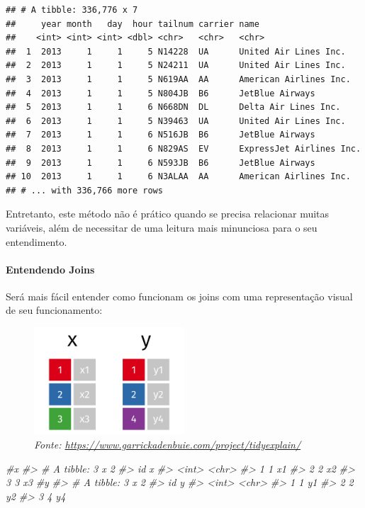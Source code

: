 \documentclass[
]{article}
\newenvironment{Shaded}{\begin{snugshade}}{\end{snugshade}}
\newcommand{\CommentTok}[1]{\textcolor[rgb]{0.56,0.35,0.01}{\textit{#1}}}
\begin{document}
\begin{verbatim}
## # A tibble: 336,776 x 7
##     year month   day  hour tailnum carrier name                    
##    <int> <int> <int> <dbl> <chr>   <chr>   <chr>                   
##  1  2013     1     1     5 N14228  UA      United Air Lines Inc.   
##  2  2013     1     1     5 N24211  UA      United Air Lines Inc.   
##  3  2013     1     1     5 N619AA  AA      American Airlines Inc.  
##  4  2013     1     1     5 N804JB  B6      JetBlue Airways         
##  5  2013     1     1     6 N668DN  DL      Delta Air Lines Inc.    
##  6  2013     1     1     5 N39463  UA      United Air Lines Inc.   
##  7  2013     1     1     6 N516JB  B6      JetBlue Airways         
##  8  2013     1     1     6 N829AS  EV      ExpressJet Airlines Inc.
##  9  2013     1     1     6 N593JB  B6      JetBlue Airways         
## 10  2013     1     1     6 N3ALAA  AA      American Airlines Inc.  
## # ... with 336,766 more rows
\end{verbatim}

Entretanto, este método não é prático quando se precisa relacionar
muitas variáveis, além de necessitar de uma leitura mais minunciosa para
o seu entendimento.

\hypertarget{entendendo-joins}{%
\paragraph{Entendendo Joins}\label{entendendo-joins}}

Será mais fácil entender como funcionam os joins com uma representação
visual de seu funcionamento:

\begin{figure}
\centering
\includegraphics[width=0.5\textwidth,height=\textheight]{original-dfs.png}
\caption{\emph{Fonte:
\url{https://www.garrickadenbuie.com/project/tidyexplain/}}}
\end{figure}

\begin{Shaded}
\begin{Highlighting}[]
\CommentTok{#x}
\CommentTok{#> # A tibble: 3 x 2}
\CommentTok{#>      id x    }
\CommentTok{#>   <int> <chr>}
\CommentTok{#> 1     1 x1   }
\CommentTok{#> 2     2 x2   }
\CommentTok{#> 3     3 x3}
\CommentTok{#y}
\CommentTok{#> # A tibble: 3 x 2}
\CommentTok{#>      id y    }
\CommentTok{#>   <int> <chr>}
\CommentTok{#> 1     1 y1   }
\CommentTok{#> 2     2 y2   }
\CommentTok{#> 3     4 y4}
\end{Highlighting}
\end{Shaded}
\end{document}
